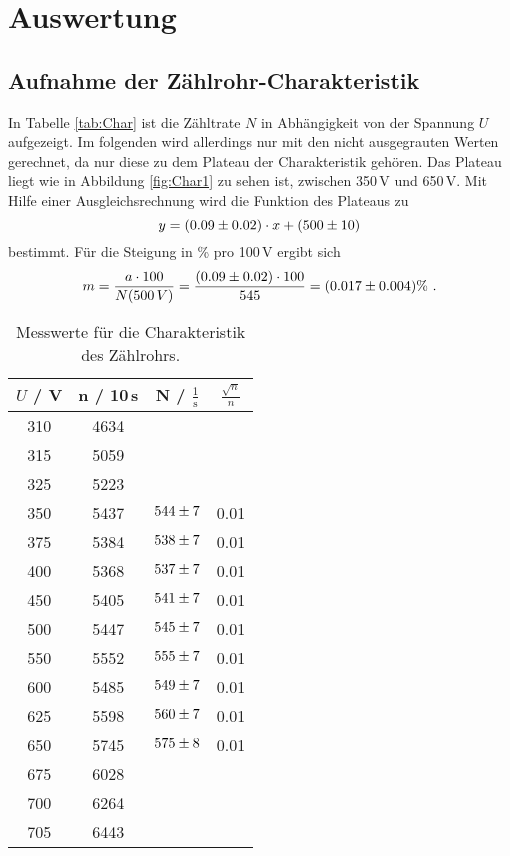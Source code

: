 \section{Auswertung}
\label{sec:Auswertung}

\subsection{Aufnahme der Zählrohr-Charakteristik}
In Tabelle \eqref{tab:Char} ist die Zähltrate $N$ in Abhängigkeit von der Spannung $U$ aufgezeigt. Im folgenden wird allerdings nur mit den nicht ausgegrauten Werten gerechnet, da nur diese zu dem Plateau der Charakteristik gehören. Das Plateau liegt wie in Abbildung \eqref{fig:Char1} zu sehen ist, zwischen 350\,V und 650\,V. Mit Hilfe einer Ausgleichsrechnung wird die Funktion des Plateaus zu
\begin{equation*}
  y = (\num{0.09 +- 0.02}) \cdot x + (\num{500 +- 10})
\end{equation*}
bestimmt. Für die Steigung in \% pro 100\,V ergibt sich
\begin{equation*}
  m = \frac{a\cdot100}{N(500\,V)} = \frac{(\num{0.09 +- 0.02})\cdot100}{545} = (\num{0.017 +- 0.004})\% \ .
\end{equation*}

\begin{table}[H]
  \centering
  \begin{tabular}{c|c|c|c}
    \hline
    $U$ / V & n / 10\,s & N / $\frac{1}{\text{s}}$ & $\frac{\sqrt{n}}{n}$ \\
    \hline
    \rowcolor{lightgray} 310 & 4634 & & \\
    \rowcolor{lightgray} 315 & 5059 & & \\
    \rowcolor{lightgray} 325 & 5223 & & \\
    \hline
    \hline
    350 & 5437 & $\num{544 +- 7}$ & 0.01 \\
    375 & 5384 & $\num{538 +- 7}$ & 0.01 \\
    400 & 5368 & $\num{537 +- 7}$ & 0.01 \\
    450 & 5405 & $\num{541 +- 7}$ & 0.01 \\
    500 & 5447 & $\num{545 +- 7}$ & 0.01 \\
    550 & 5552 & $\num{555 +- 7}$ & 0.01 \\
    600 & 5485 & $\num{549 +- 7}$ & 0.01 \\
    625 & 5598 & $\num{560 +- 7}$ & 0.01 \\
    650 & 5745 & $\num{575 +- 8}$ & 0.01 \\
    \hline
    \hline
    \rowcolor{lightgray} 675 & 6028 & & \\
    \rowcolor{lightgray} 700 & 6264 & & \\
    \rowcolor{lightgray} 705 & 6443 & & \\
    \hline
  \end{tabular}
  \caption{Messwerte für die Charakteristik des Zählrohrs.}
  \label{tab:Char}
\end{table}


